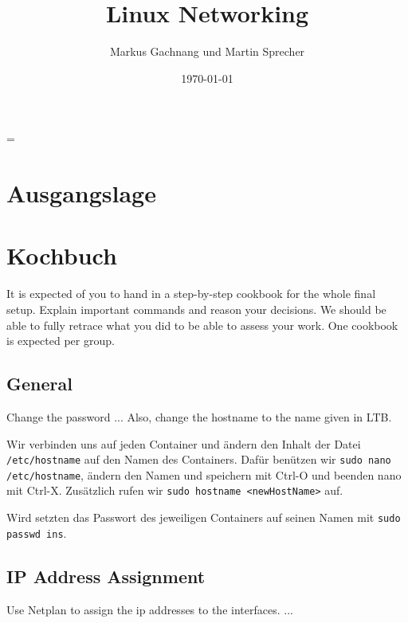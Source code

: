 \documentclass[11pt,titlepage]{article}
\title{Linux Networking}
\author{Markus Gachnang und Martin Sprecher}
\date{\today{}}
\newenvironment{shadedquotation}
 {\begin{shaded*}
  \quoting[leftmargin=0pt, vskip=0pt]
 }
 {\endquoting
 \end{shaded*}
}
\begin{document}
\sffamily
\maketitle
\newpage
\tableofcontents{}
\setcounter{page}{1}
\newpage
\RaggedRight
\emergencystretch=\maxdimen
{}

\section{Ausgangslage}
\label{sec:Ausgangslage}


\section{Kochbuch}
\label{sec:Kochbuch}

\begin{shadedquotation}
  It is expected of you to hand in a step-by-step cookbook for the whole final setup. Explain important commands and reason your decisions. We should be able to fully retrace what you did to be able to assess your work. One cookbook is expected per group.
\end{shadedquotation}

\subsection{General}
\label{subsec:General}
\begin{shadedquotation}
  Change the password ... Also, change the hostname to the name given in LTB.
\end{shadedquotation}

Wir verbinden uns auf jeden Container und ändern den Inhalt der Datei \lstinline!/etc/hostname! auf den Namen des Containers.
Dafür benützen wir \lstinline!sudo nano /etc/hostname!, ändern den Namen und speichern mit Ctrl-O und beenden nano mit Ctrl-X.
Zusätzlich rufen wir \lstinline!sudo hostname <newHostName>! auf.

Wird setzten das Passwort des jeweiligen Containers auf seinen Namen mit \lstinline!sudo passwd ins!.

\subsection{IP Address Assignment}
\label{subsec:IPAddressAssignment}
\begin{shadedquotation}
  Use Netplan to assign the ip addresses to the interfaces. ...
\end{shadedquotation}
\end{document}
